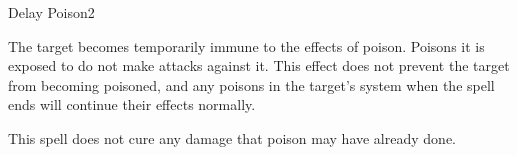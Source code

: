 \begin{spellsection}{Delay Poison}{2}
    \begin{spellheader}
    \end{spellheader}
    \begin{spellcontent}
        \begin{spelltargetinginfo}
        \end{spelltargetinginfo}
        \begin{spelleffects}
            \spelleffect The target becomes temporarily immune to the effects of poison. Poisons it is exposed to do not make attacks against it. This effect does not prevent the target from becoming poisoned, and any poisons in the target's system when the spell ends will continue their effects normally. 
            \spelldur \durshort
        \end{spelleffects}
    \end{spellcontent}
    \begin{spellfooter}
        \spellnotes This spell does not cure any damage that poison may have already done.
        \miscastrandom
    \end{spellfooter}
\end{spellsection}

